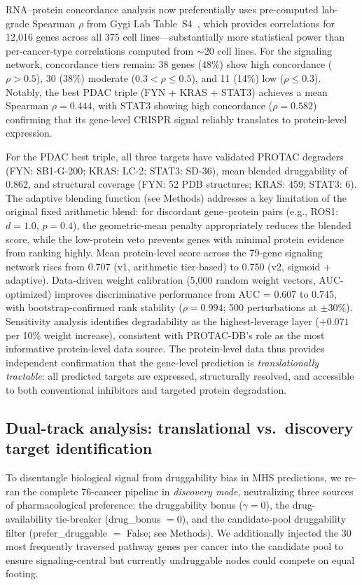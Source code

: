 \documentclass[times, twoside, watermark]{zHenriquesLab-StyleBioRxiv}
\begin{document}
RNA--protein concordance analysis now preferentially uses pre-computed lab-grade Spearman $\rho$ from Gygi Lab Table~S4~\cite{Nusinow2020}, which provides correlations for 12{,}016 genes across all 375 cell lines---substantially more statistical power than per-cancer-type correlations computed from $\sim$20 cell lines. For the signaling network, concordance tiers remain: 38 genes (48\%) show high concordance ($\rho > 0.5$), 30 (38\%) moderate ($0.3 < \rho \leq 0.5$), and 11 (14\%) low ($\rho \leq 0.3$). Notably, the best PDAC triple (FYN + KRAS + STAT3) achieves a mean Spearman $\rho = 0.444$, with STAT3 showing high concordance ($\rho = 0.582$) confirming that its gene-level CRISPR signal reliably translates to protein-level expression.

For the PDAC best triple, all three targets have validated PROTAC degraders (FYN: SB1-G-200; KRAS: LC-2; STAT3: SD-36), mean blended druggability of 0.862, and structural coverage (FYN: 52 PDB structures; KRAS: 459; STAT3: 6). The adaptive blending function (see Methods) addresses a key limitation of the original fixed arithmetic blend: for discordant gene--protein pairs (e.g., ROS1: $d = 1.0$, $p = 0.4$), the geometric-mean penalty appropriately reduces the blended score, while the low-protein veto prevents genes with minimal protein evidence from ranking highly. Mean protein-level score across the 79-gene signaling network rises from 0.707 (v1, arithmetic tier-based) to 0.750 (v2, sigmoid + adaptive). Data-driven weight calibration (5{,}000 random weight vectors, AUC-optimized) improves discriminative performance from AUC = 0.607 to 0.745, with bootstrap-confirmed rank stability ($\rho = 0.994$; 500 perturbations at $\pm 30\%$). Sensitivity analysis identifies degradability as the highest-leverage layer ($+0.071$ per 10\% weight increase), consistent with PROTAC-DB's role as the most informative protein-level data source. The protein-level data thus provides independent confirmation that the gene-level prediction is \emph{translationally tractable}: all predicted targets are expressed, structurally resolved, and accessible to both conventional inhibitors and targeted protein degradation.
\subsection*{Dual-track analysis: translational vs.\ discovery target identification}

To disentangle biological signal from druggability bias in MHS predictions, we re-ran the complete 76-cancer pipeline in \emph{discovery mode}, neutralizing three sources of pharmacological preference: the druggability bonus ($\gamma = 0$), the drug-availability tie-breaker (drug\_bonus $= 0$), and the candidate-pool druggability filter (prefer\_druggable $=$ False; see Methods). We additionally injected the 30 most frequently traversed pathway genes per cancer into the candidate pool to ensure signaling-central but currently undruggable nodes could compete on equal footing.
\end{document}
